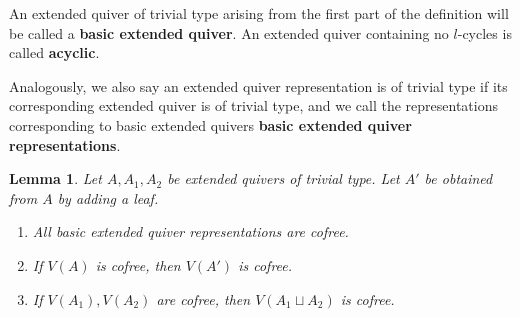 \documentclass[12pt]{article}
\newtheorem{lemma}[theorem]{Lemma}
\theoremstyle{definition}
\theoremstyle{remark}
\begin{document}
An extended quiver of trivial type arising from the first part of the definition will be called a \textbf{basic extended quiver}. An extended quiver containing no $l$-cycles is called \textbf{acyclic}.

Analogously, we also say an extended quiver representation is of trivial type if its corresponding extended quiver is of trivial type, and we call the representations corresponding to basic extended quivers \textbf{basic extended quiver representations}.

\begin{lemma}\label{lem:cofree}
    Let $A,A_1,A_2$ be extended quivers of trivial type. Let $A'$ be obtained from $A$ by adding a leaf.
    
    \begin{enumerate}
        \item All basic extended quiver representations are cofree.\label{lem:cofree1}
        \item If $V(A)$ is cofree, then $V(A')$ is cofree.\label{lem:cofree2}
        \item If $V(A_1),V(A_2)$ are cofree, then $V(A_1\sqcup A_2)$ is cofree.\label{lem:cofree3}
    \end{enumerate}
\end{lemma}
\end{document}
